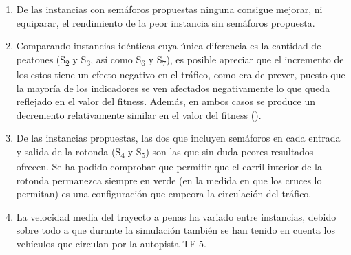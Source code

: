 \begin{enumerate}
    \item De las instancias con semáforos propuestas ninguna consigue mejorar, ni equiparar, el rendimiento de la peor instancia sin semáforos propuesta.
    \item  Comparando instancias idénticas cuya única diferencia es la cantidad de peatones (S\textsubscript{2} y S\textsubscript{3}, así como S\textsubscript{6} y S\textsubscript{7}), es posible apreciar que el incremento de los estos tiene un efecto negativo en el tráfico, como era de prever, puesto que la mayoría de los indicadores se ven afectados negativamente lo que queda reflejado en el valor del fitness. Además, en ambos casos se produce un decremento relativamente similar en el valor del fitness ().
    \item De las instancias propuestas, las dos que incluyen semáforos en cada entrada y salida de la rotonda (S\textsubscript{4} y S\textsubscript{5}) son las que sin duda peores resultados ofrecen. Se ha podido comprobar que permitir que el carril interior de la rotonda permanezca siempre en verde (en la medida en que los cruces lo permitan) es una configuración que empeora la circulación del tráfico.
    \item La velocidad media del trayecto a penas ha variado entre instancias, debido sobre todo a que durante la simulación también se han tenido en cuenta los vehículos que circulan por la autopista TF-5.
\end{enumerate}
